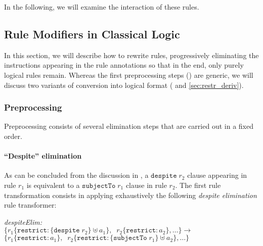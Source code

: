 In the following, we will examine the interaction of these rules.

\subsection{Rule Modifiers in Classical Logic}\label{sec:rule_modifiers_in_classical_logic}

In this section, we will describe how to rewrite rules, progressively
eliminating the instructions appearing in the rule annotations so that in the
end, only purely logical rules remain. Whereas the first preprocessing steps
() are generic, we will discuss two variants of
conversion into logical format ( and
\ref{sec:restr_deriv}).



\subsubsection{Preprocessing}\label{sec:preprocessing}

Preprocessing consists of several elimination steps that are carried out in a
fixed order.

\paragraph{\textbf{``Despite''  elimination}}

As can be concluded from the discussion in , a
$\mathtt{despite}\; r_2$ clause appearing in rule $r_1$ is equivalent to a
$\mathtt{subjectTo}\; r_1$ clause in rule $r_2$. The first rule transformation
consists in applying exhaustively the following \emph{despite elimination}
rule transformer:

\noindent
\emph{despiteElim:}\\
$
\{r_1 \{\mathtt{restrict}: \{\mathtt{despite}\; r_2\} \uplus a_1\},\;\;
r_2\{\mathtt{restrict}: a_2\}, \dots\} \longrightarrow$\\
$\{r_1 \{\mathtt{restrict}: a_1\},\;\;
r_2\{\mathtt{restrict}:  \{\mathtt{subjectTo}\; r_1\} \uplus a_2\}, \dots\}
$

